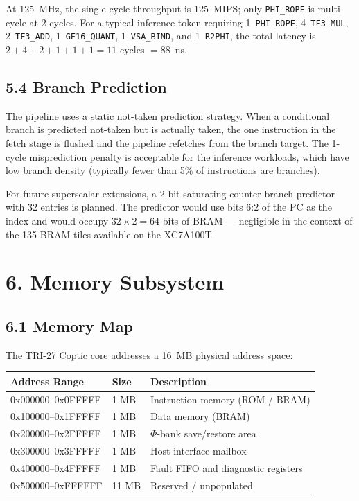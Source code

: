 At 125~MHz, the single-cycle throughput is 125~MIPS; only
\texttt{PHI\_ROPE} is multi-cycle at 2 cycles. For a typical
inference token requiring 1~\texttt{PHI\_ROPE}, 4~\texttt{TF3\_MUL},
2~\texttt{TF3\_ADD}, 1~\texttt{GF16\_QUANT}, 1~\texttt{VSA\_BIND},
and 1~\texttt{R2PHI}, the total latency is
\(2 + 4 + 2 + 1 + 1 + 1 = 11\) cycles \(= 88\)~ns.

\subsection{5.4 Branch Prediction}\label{fa_71:branch-prediction}

The pipeline uses a static not-taken prediction strategy. When a
conditional branch is predicted not-taken but is actually taken,
the one instruction in the fetch stage is flushed and the pipeline
refetches from the branch target. The 1-cycle misprediction penalty
is acceptable for the inference workloads, which have low branch
density (typically fewer than 5\% of instructions are branches).

For future superscalar extensions, a 2-bit saturating counter
branch predictor with 32 entries is planned. The predictor would
use bits 6:2 of the PC as the index and would occupy
\(32 \times 2 = 64\) bits of BRAM --- negligible in the context
of the 135 BRAM tiles available on the XC7A100T.

\section{6. Memory Subsystem}\label{fa_71:memory-subsystem}

\subsection{6.1 Memory Map}\label{fa_71:memory-map}

The TRI-27 Coptic core addresses a 16~MB physical address space:

\begin{longtable}[]{@{}llp{6cm}@{}}
\toprule\noalign{}
Address Range & Size & Description \\
\midrule\noalign{}
\endhead
\bottomrule\noalign{}
\endlastfoot
0x000000--0x0FFFFF & 1 MB & Instruction memory (ROM / BRAM) \\
0x100000--0x1FFFFF & 1 MB & Data memory (BRAM) \\
0x200000--0x2FFFFF & 1 MB & $\Phi$-bank save/restore area \\
0x300000--0x3FFFFF & 1 MB & Host interface mailbox \\
0x400000--0x4FFFFF & 1 MB & Fault FIFO and diagnostic registers \\
0x500000--0xFFFFFF & 11 MB & Reserved / unpopulated \\
\end{longtable}

